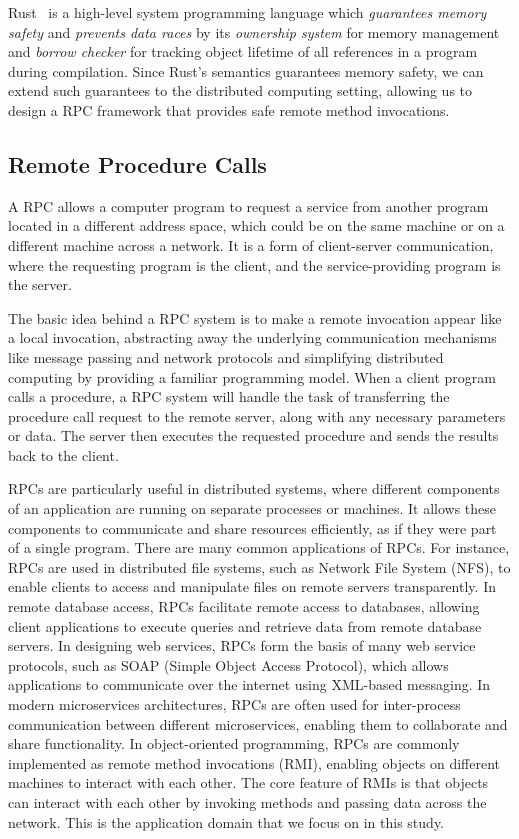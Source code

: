 Rust~\citep{10.5555/3271463} is a high-level system programming language which \emph{guarantees memory safety} and \emph{prevents data races} by its \emph{ownership system} for memory management and \emph{borrow checker} for tracking object lifetime of all references in a program during compilation.
Since Rust's semantics guarantees memory safety, we can extend such guarantees to the distributed computing setting, allowing us to design a RPC framework that provides safe remote method invocations.

\subsection{Remote Procedure Calls}
\label{chap3:background:rpc}
A RPC allows a computer program to request a service from another program located in a different address space, which could be on the same machine or on a different machine across a network. It is a form of client-server communication, where the requesting program is the client, and the service-providing program is the server.

The basic idea behind a RPC system is to make a remote invocation appear like a local invocation, abstracting away the underlying communication mechanisms like message passing and network protocols and simplifying distributed computing by providing a familiar programming model. When a client program calls a procedure, a RPC system will handle the task of transferring the procedure call request to the remote server, along with any necessary parameters or data. The server then executes the requested procedure and sends the results back to the client.

RPCs are particularly useful in distributed systems, where different components of an application are running on separate processes or machines. It allows these components to communicate and share resources efficiently, as if they were part of a single program. There are many common applications of RPCs. For instance, RPCs are used in distributed file systems, such as Network File System (NFS), to enable clients to access and manipulate files on remote servers transparently. In remote database access, RPCs facilitate remote access to databases, allowing client applications to execute queries and retrieve data from remote database servers. In designing web services, RPCs form the basis of many web service protocols, such as SOAP (Simple Object Access Protocol), which allows applications to communicate over the internet using XML-based messaging. In modern microservices architectures, RPCs are often used for inter-process communication between different microservices, enabling them to collaborate and share functionality. In object-oriented programming, RPCs are commonly implemented as remote method invocations (RMI), enabling objects on different machines to interact with each other. The core feature of RMIs is that objects can interact with each other by invoking methods and passing data across the network. This is the application domain that we focus on in this study.

